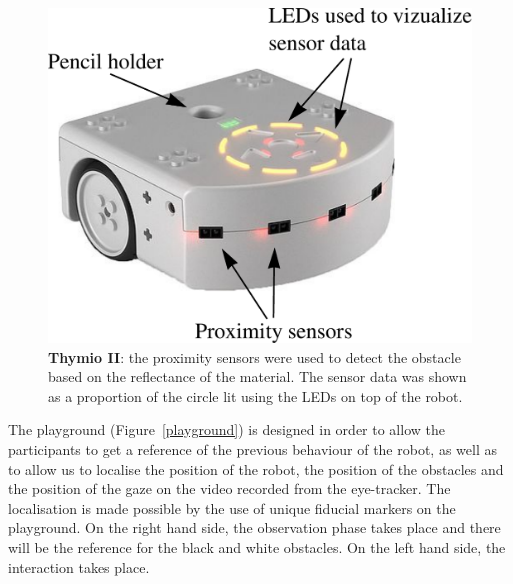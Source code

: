\documentclass{sig-alternate}
\begin{document}
\begin{figure}
    \centering
    \includegraphics[width=0.9\linewidth]{thymio}
    \caption{\small \textbf{Thymio II}: the proximity sensors were used to
    detect the obstacle based on the reflectance of the material. The sensor
    data was shown as a proportion of the circle lit using the LEDs on top of the
    robot.}

    \label{thymio}
\end{figure}

The playground (Figure~\ref{playground}) is designed in order to allow the
participants to get a reference of the previous behaviour of the robot, as well
as to allow us to localise the position of the robot, the position of the
obstacles and the position of the gaze on the video recorded from the
eye-tracker. The localisation is made possible by the use of unique fiducial
markers on the playground. On the right hand side, the observation phase takes
place and there will be the reference for the black and white obstacles. On the
left hand side, the interaction takes place.
\end{document}
